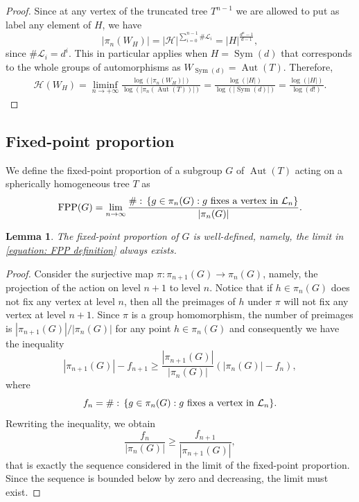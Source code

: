 \documentclass{amsart}
\def\set#1{{\def\st{\;:\;}\left\{#1\right\}}}
\def\abs#1{\left\vert{#1}\right\vert}
\DeclareMathOperator{\Aut}{Aut}
\DeclareMathOperator{\FPP}{FPP}
\DeclareMathOperator{\Sym}{Sym}
\DeclareMathOperator{\st}{st}
\newtheorem{Lemma}[Proposition]{Lemma}
\begin{document}
\begin{proof}
Since at any vertex of the truncated tree $T^{n-1}$ we are allowed to put as label any element of $H$, we have $$\abs{\pi_n(W_H)} = \abs{\mathcal{H}}^{\sum_{i = 0}^{n-1} \# \mathcal{L}_i} = \abs{H}^{\frac{d^n-1}{d-1}},$$ since $\# \mathcal{L}_i = d^i$. This in particular applies when $H = \Sym(d)$ that corresponds to the whole groups of automorphisms as $W_{\Sym(d)} = \Aut(T)$. Therefore, 
\begin{align*}
\mathcal{H}(W_H) = \liminf_{n \rightarrow +\infty} \frac{\log(\abs{\pi_n(W_H)})}{\log(\abs{\pi_n(\Aut(T))})} = \frac{\log(\abs{H})}{\log(\abs{\Sym(d)})} = \frac{\log(\abs{H})}{\log(d!)}.
\end{align*}
\end{proof}

\subsection{Fixed-point proportion}

We define the fixed-point proportion of a subgroup $G$ of $\Aut(T)$ acting on a spherically homogeneous tree $T$ as 
\begin{equation}
\FPP(G) = \lim_{n \rightarrow \infty} \frac{\# \set{g \in \pi_n(G): \text{$g$ fixes a vertex in $\mathcal{L}_n$}}}{\abs{\pi_n(G)}}.
\label{equation: FPP definition}
\end{equation}

\begin{Lemma}
The fixed-point proportion of $G$ is well-defined, namely, the limit in \cref{equation: FPP definition} always exists. 
\label{lemma: FPP exists}
\end{Lemma}

\begin{proof}
Consider the surjective map $\pi: \pi_{n+1}(G) \rightarrow \pi_n(G)$, namely, the projection of the action on level $n+1$ to level $n$. Notice that if $h \in \pi_n(G)$ does not fix any vertex at level $n$, then all the preimages of $h$ under $\pi$ will not fix any vertex at level $n+1$. Since $\pi$ is a group homomorphism, the number of preimages is $\abs{\pi_{n+1}(G)}/\abs{\pi_n(G)}$ for any point $h \in \pi_n(G)$ and consequently we have the inequality $$\abs{\pi_{n+1}(G)} - f_{n+1} \geq \frac{\abs{\pi_{n+1}(G)}}{\abs{\pi_n(G)}} \left(\abs{\pi_n(G)} - f_n \right),$$ where $$f_n = \# \set{g \in \pi_n(G): \text{$g$ fixes a vertex in $\mathcal{L}_n$}}.$$ Rewriting the inequality, we obtain $$\frac{f_n}{\abs{\pi_n(G)}} \geq \frac{f_{n+1}}{\abs{\pi_{n+1}(G)}},$$ that is exactly the sequence considered in the limit of the fixed-point proportion. Since the sequence is bounded below by zero and decreasing, the limit must exist.
\end{proof}
\end{document}
